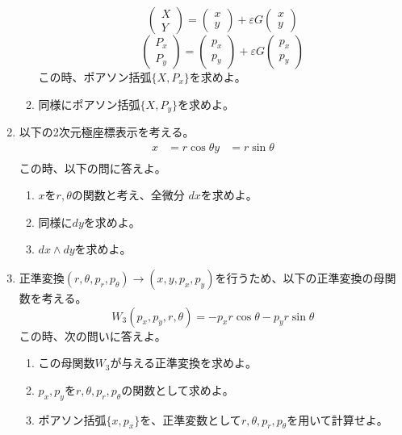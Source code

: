 \documentclass{jsarticle}
\begin{document}
\begin{enumerate}
\begin{enumerate}
                $$
                  \begin{pmatrix}
                    X \\ Y
                  \end{pmatrix}
                  =
                  \begin{pmatrix}
                    x \\ y
                  \end{pmatrix}
                  + \varepsilon G
                  \begin{pmatrix}
                    x \\ y
                  \end{pmatrix}
                $$
                $$
                  \begin{pmatrix}
                    P_x \\ P_y
                  \end{pmatrix}
                  =
                  \begin{pmatrix}
                    p_x \\ p_y
                  \end{pmatrix}
                  + \varepsilon G
                  \begin{pmatrix}
                    p_x \\ p_y
                  \end{pmatrix}
                $$
                この時、ポアソン括弧$\{X, P_x\}$を求めよ。
          \item 同様にポアソン括弧$\{X, P_y\}$を求めよ。
        \end{enumerate}
        \newpage
  \item 以下の2次元極座標表示を考える。
        $$
          \begin{aligned}
            x & = r \cos \theta
            y & = r \sin \theta \\
          \end{aligned}
        $$
        この時、以下の問に答えよ。
        \begin{enumerate}
          \item $x$を$r, \theta$の関数と考え、全微分 $dx$を求めよ。
          \item 同様に$dy$を求めよ。
          \item $dx \wedge dy$を求めよ。
        \end{enumerate}
  \item 正準変換$(r, \theta, p_r, p_\theta) \rightarrow (x, y, p_x, p_y)$を行うため、以下の正準変換の母関数を考える。
        $$
          W_3(p_x, p_y, r, \theta) = - p_x r \cos \theta - p_y r \sin \theta
        $$
        この時、次の問いに答えよ。
        \begin{enumerate}
          \item この母関数$W_3$が与える正準変換を求めよ。
          \item $p_x, p_y$を$r, \theta, p_r, p_\theta$の関数として求めよ。
          \item ポアソン括弧$\{x, p_x\}$を、正準変数として$r, \theta, p_r, p_\theta$を用いて計算せよ。
        \end{enumerate}
\end{enumerate}
\end{document}
